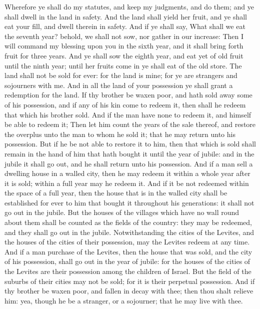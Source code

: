 \begin{biblechapter}
\verse Wherefore ye shall do my statutes, and keep my judgments, and do them; and ye shall dwell in the land in safety.
\verse And the land shall yield her fruit, and ye shall eat your fill, and dwell therein in safety.
\verse And if ye shall say, What shall we eat the seventh year? behold, we shall not sow, nor gather in our increase:
\verse Then I will command my blessing upon you in the sixth year, and it shall bring forth fruit for three years.
\verse And ye shall sow the eighth year, and eat yet of old fruit until the ninth year; until her fruits come in ye shall eat of the old store.
\verse The land shall not be sold for ever: for the land is mine; for ye are strangers and sojourners with me.
\verse And in all the land of your possession ye shall grant a redemption for the land.
\verse If thy brother be waxen poor, and hath sold away some of his possession, and if any of his kin come to redeem it, then shall he redeem that which his brother sold.
\verse And if the man have none to redeem it, and himself be able to redeem it;
\verse Then let him count the years of the sale thereof, and restore the overplus unto the man to whom he sold it; that he may return unto his possession.
\verse But if he be not able to restore it to him, then that which is sold shall remain in the hand of him that hath bought it until the year of jubile: and in the jubile it shall go out, and he shall return unto his possession.
\verse And if a man sell a dwelling house in a walled city, then he may redeem it within a whole year after it is sold; within a full year may he redeem it.
\verse And if it be not redeemed within the space of a full year, then the house that is in the walled city shall be established for ever to him that bought it throughout his generations: it shall not go out in the jubile.
\verse But the houses of the villages which have no wall round about them shall be counted as the fields of the country: they may be redeemed, and they shall go out in the jubile.
\verse Notwithstanding the cities of the Levites, and the houses of the cities of their possession, may the Levites redeem at any time.
\verse And if a man purchase of the Levites, then the house that was sold, and the city of his possession, shall go out in the year of jubile: for the houses of the cities of the Levites are their possession among the children of Israel.
\verse But the field of the suburbs of their cities may not be sold; for it is their perpetual possession.
\verse And if thy brother be waxen poor, and fallen in decay with thee; then thou shalt relieve him: yea, though he be a stranger, or a sojourner; that he may live with thee.

\end{biblechapter}

